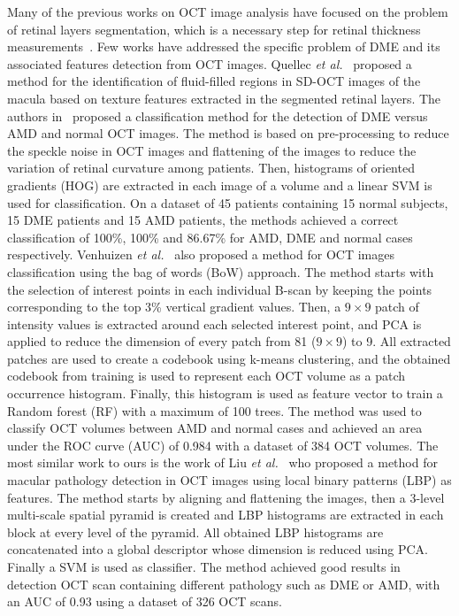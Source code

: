 Many of the previous works on OCT image analysis have focused on the problem of retinal layers segmentation, which is a necessary step for retinal thickness measurements~\cite{Chiu2010,Kafieh2013}.
Few works have addressed the specific problem of DME and its associated features detection from OCT images. Quellec \textit{et al.}~\cite{Quellec2010} proposed a method for the identification of fluid-filled regions in SD-OCT images of the macula based on texture features extracted in the segmented retinal layers.
The authors in~\cite{Srinivasan2014} proposed a classification method for the detection of DME versus AMD and normal OCT images. The method is based on pre-processing to reduce the speckle noise in OCT images and flattening of the images to reduce the variation of retinal curvature among patients. Then, histograms of oriented gradients (HOG) are extracted in each image of a volume and a linear SVM is used for classification. On a dataset of 45 patients containing 15 normal subjects, 15 DME patients and 15 AMD patients, the methods achieved a correct classification of 100\%, 100\% and 86.67\% for AMD, DME and normal cases respectively. 
Venhuizen \textit{et al.}~\cite{Venhuizen2015} also proposed a method for OCT images classification using the bag of words (BoW) approach.
The method starts with the selection of interest points in each individual B-scan by keeping the points corresponding to the top 3\% vertical gradient values. Then, a $9\times 9$ patch of intensity values is extracted around each selected interest point, and PCA is applied to reduce the dimension of every patch from 81 ($9\times 9$) to 9. 
All extracted patches are used to create a codebook using k-means clustering, and the obtained codebook from training is used to represent each OCT volume as a patch occurrence histogram. Finally, this histogram is used as feature vector to train a Random forest (RF) with a maximum of 100 trees. The method was used to classify OCT volumes between AMD and normal cases and achieved an area under the ROC curve (AUC) of 0.984 with a dataset of 384 OCT volumes. 
The most similar work to ours is the work of Liu \textit{et al.}~\cite{Liu2011} who proposed a method for macular pathology detection in OCT images using local binary patterns (LBP) as features.
The method starts by aligning and flattening the images, then a 3-level multi-scale spatial pyramid is created and LBP histograms are extracted in each block at every level of the pyramid. All obtained LBP histograms are concatenated into a global descriptor whose dimension is reduced using PCA. Finally a SVM is used as classifier. The method achieved good results in detection OCT scan containing different pathology such as DME or AMD, with an AUC of 0.93 using a dataset of 326 OCT scans.  


